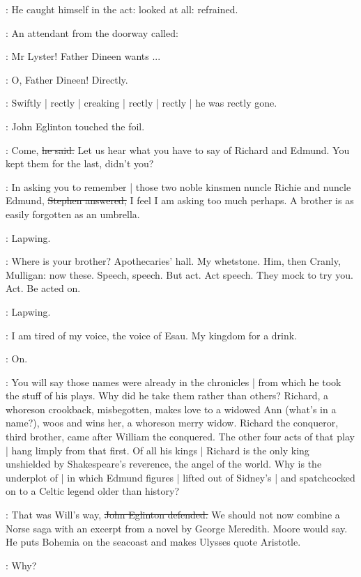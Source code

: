 :
He caught himself in the act:
looked at all:
refrained.

:
An attendant from the doorway called:

\attendant:
Mr Lyster!
Father Dineen wants ...

\librarian:
O, Father Dineen!
Directly.

:
Swiftly | rectly | creaking | rectly | rectly | he was rectly gone.

:
John Eglinton touched the foil.

\eglinton:
Come,
\sout{he said.}
Let us hear what you have to say of Richard and Edmund.
You kept them for the last,
didn't you?

\Stephen:
In asking you to remember |
those two noble kinsmen nuncle Richie and nuncle Edmund,
\sout{Stephen answered,}
I feel I am asking too much perhaps.
A brother is as easily forgotten as an umbrella.

\StephenInt:
Lapwing.

\StephenInt:
Where is your brother?
Apothecaries' hall.
My whetstone.
Him,
then Cranly,
Mulligan:
now these.
Speech,
speech.
But act.
Act speech.
They mock to try you.
Act.
Be acted on.

\StephenInt:
Lapwing.

\StephenInt:
I am tired of my voice,
the voice of Esau.
My kingdom for a drink.

\StephenInt:
On.

\Stephen:
You will say those names were already in the chronicles |
from which he took the stuff of his plays.
Why did he take them rather than others?
Richard,
a whoreson crookback,
misbegotten,
makes love to a widowed Ann
(what's in a name?),
woos and wins her,
a whoreson merry widow.
Richard the conqueror,
third brother,
came after William the conquered.
The other four acts of that play |
hang limply from that first.
Of all his kings |
Richard is the only king unshielded by Shakespeare's reverence,
the angel of the world.
Why is the underplot of  |
in which Edmund figures |
lifted out of Sidney's  |
and spatchcocked on to a Celtic legend older than history?

\eglinton:
That was Will's way,
\sout{John Eglinton defended.}
We should not now combine a Norse saga with an excerpt from a novel by George Meredith.
Moore would say.
He puts Bohemia on the seacoast and makes Ulysses quote Aristotle.

\Stephen:
Why?

